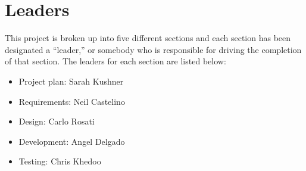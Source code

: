 \section{Leaders}
This project is broken up into five different sections and each section has been designated a ``leader,” or somebody who is responsible for driving the completion of that section. The leaders for each section are listed below:
\begin{itemize}
 \item Project plan: Sarah Kushner
 \item Requirements: Neil Castelino
 \item Design: Carlo Rosati
 \item Development: Angel Delgado
 \item Testing: Chris Khedoo
\end{itemize}
